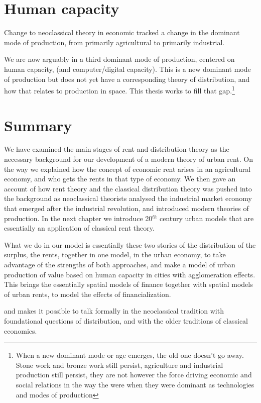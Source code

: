\section{Human capacity}
Change to neoclassical theory in economic tracked a change in the dominant mode of production, from primarily agricultural to primarily industrial.

We are now arguably in a third dominant mode of production, centered on  human capacity, (and computer/digital capacity). This is a new dominant mode of production but does not yet have a corresponding theory of distribution, and how that relates to production in space. 
This thesis works to fill that gap.\footnote{When a new dominant mode or age emerges, the old one doesn't go away. Stone work and bronze work still persist, agriculture and industrial production still persist, they are not however the force driving economic and social relations in the way the were when they were dominant as technologies and modes of production\cite{oldworldsdon'tdie}}
 
\section{Summary}
We have examined the main stages of rent and distribution theory
as the necessary background for our development %
of a modern theory of urban rent. On the way we explained how the concept of economic rent arises in an agricultural economy, and who gets the rents in that type of economy. We then gave an account of how rent theory and the classical distribution theory was pushed into the background as neoclassical theorists analysed the industrial market economy that emerged after the industrial revolution, and introduced modern theories of production. In the next chapter we introduce 20$^{th}$ century urban models that are essentially an application of classical rent theory.


What we do in our  model is essentially these two stories of the distribution of the surplus, the rents, together in one model, in the urban economy, to take advantage of the strengths of both approaches, and make a model of %
urban production of value based on human capacity in cities with agglomeration effects. 
This brings the essentially spatial models of finance together with spatial models of urban rents, to model the effects of financialization. 

and makes it possible to talk formally in the neoclassical tradition with foundational questions of distribution, and with the older traditions of classical economics. 


